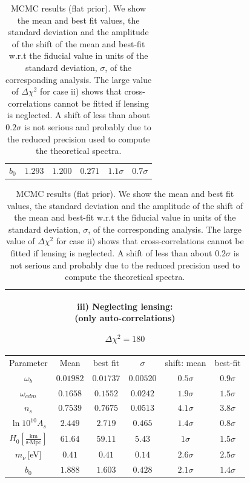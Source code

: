 \begin{table}[!t]
\begin{tabular}{@{}cccccc}
    $b_0$ & $1.293$ & $1.200$ & $0.271$ & \quad$1.1\sigma$ & $0.7\sigma$\\
  \end{tabular}
  \begin{tabular}{@{}cccccc}
    \hline
    \multicolumn{6}{c}{\parbox[t]{4.4cm}{iii) Neglecting lensing: \\ \hspace*{0.9cm} (only auto-correlations)} $\Delta \chi^2 = 180$} \\
    \hline
    Parameter & Mean & best fit & $\sigma$ & \hspace{-0.52cm} shift: mean & best-fit\\
    \hline
    $\omega_b$ & $0.01982 $ & $0.01737 $ & $0.00520 $ &  \quad$0.5\sigma$ & $0.9\sigma$ \\
    $\omega_{cdm}$ & $0.1658 $ & $0.1552 $ & $0.0242 $ &  \quad$1.9\sigma$ & $1.5\sigma$ \\
    $n_s$      & $0.7539 $ & $0.7675 $ & $0.0513 $ &  \quad$4.1\sigma$ & $3.8\sigma$ \\
    $\ln10^{10}A_s$ & $2.449 $ & $2.719 $ & $0.465 $ &  \quad$1.4 \sigma$ & $0.8\sigma$ \\
    $H_0\left[\frac{\text{km}}{\text{s}\cdot\text{Mpc}}\right]$      & $61.64 $ & $59.11$ & $5.43$ &  \quad$1 \sigma$ & $1.5\sigma$ \\
    $m_{\nu}$\,[eV]  & $0.41$ & $0.41$ & $0.14$ &  \quad$2.6\sigma$ & $2.5\sigma$ \\
    $b_0$ & $1.888$ & $1.603$ & $0.428$ & \quad$2.1\sigma$ & $1.4\sigma$ \\
  \end{tabular}

  \caption{MCMC results (flat prior). We show the mean and best fit values, the standard deviation and the amplitude of the shift of the mean and best-fit w.r.t the fiducial value in units of the standard deviation, $\sigma$, of the corresponding analysis. The large value of $\Delta \chi^2$ for case ii) shows that cross-correlations cannot be fitted if lensing is neglected.  A shift of less than about $0.2\sigma$ is not serious and probably due to the reduced precision used to compute the theoretical spectra.}
  \label{Table:1}
\end{table}

